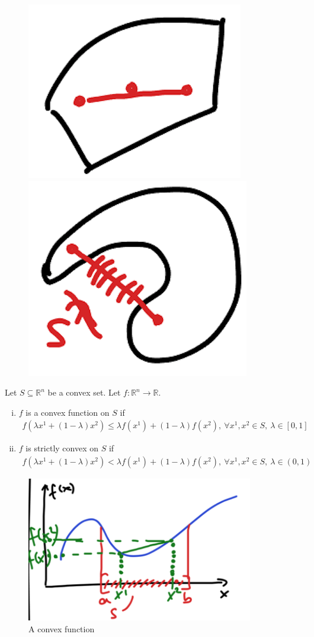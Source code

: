 \documentclass[11pt]{article}
\numberwithin{equation}{section}
\begin{document}
\begin{figure}[H]
    \centering
    \begin{minipage}{.5\textwidth}
      \centering
      \includegraphics[width=.3\linewidth]{images/2-ex-1.png}
    \end{minipage}%
    \begin{minipage}{.5\textwidth}
      \centering
      \includegraphics[width=.3\linewidth]{images/2-ex-2.png}
    \end{minipage}
\end{figure}

\begin{definition}
    Let $S \subseteq \mathbb{R}^n$ be a convex set. Let $f:\mathbb{R}^n\rightarrow \mathbb{R}$.
    \begin{enumerate}[(i)]
        \item $f$ is a convex function on $S$ if \begin{align*}
            f(\lambda x^1 + (1-\lambda)x^2) \leq \lambda f(x^1) + (1-\lambda)f(x^2), \ \forall x^1,x^2\in S, \ \lambda\in [0,1]
        \end{align*}
        \item $f$ is strictly convex on $S$ if \begin{align*}
            f(\lambda x^1 + (1-\lambda)x^2) < \lambda f(x^1) + (1-\lambda)f(x^2), \ \forall x^1,x^2\in S, \ \lambda\in (0,1)
        \end{align*}
    \end{enumerate}
\end{definition}

\begin{figure}[h]
    \centering
    \includegraphics[scale = 0.5]{images/2-ex-3.png}
    \caption{A convex function}
\end{figure}
\end{document}
